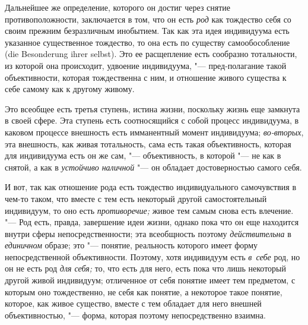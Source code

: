 Дальнейшее же определение, которого он достиг через снятие
противоположности, заключается в том, что он есть
{\em род} как тождество
себя со своим прежним безразличным инобытием. Так как эта
идея индивидуума есть указанное существенное тождество, то она есть по
существу самообособление (die Besonderung ihrer selbst). Это
ее расщепление есть сообразно тотальности, из которой она происходит,
удвоение индивидуума, "--- пред-полагание такой объективности,
которая тождественна с ним, и отношение живого существа к себе самому как к
другому живому.

Это всеобщее есть третья ступень, истина жизни, поскольку
жизнь еще замкнута в своей сфере. Эта ступень есть соотносящийся с собой
процесс индивидуума, в каковом процессе внешность есть имманентный момент
индивидуума; {\em во-вторых},
эта внешность, как живая тотальность, сама есть такая
объективность, которая для индивидуума есть он же сам, "---
объективность, в которой "--- не как в снятой, а
как в {\em устойчиво наличной}
"--- он обладает достоверностью самого себя.

И вот, так как отношение рода есть тождество индивидуального
самочувствия в чем-то таком, что вместе с тем есть некоторый другой
самостоятельный индивидуум, то оно есть {\em противоречие;} живое
тем самым снова есть влечение. "--- Род есть, правда,
завершение идеи жизни, однако пока что он еще находится внутри сферы
непосредственности; эта всеобщность поэтому
{\em действительна} в {\em единичном} образе;
это "--- понятие, реальность которого имеет форму
непосредственной объективности. Поэтому, хотя индивидуум есть
{\em в~себе} род, но он не есть род {\em для себя;}
то, что есть для него, есть пока что лишь некоторый другой
живой индивидуум; отличенное от себя понятие имеет тем предметом, с которым
оно тождественно, не себя как понятие, а некоторое такое понятие, которое,
как живое существо, вместе с тем обладает для него внешней объективностью,
"--- форма, которая поэтому непосредственно взаимна.

